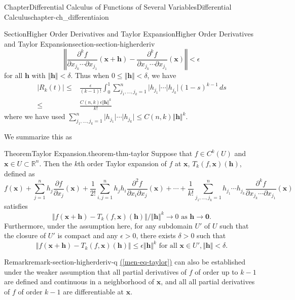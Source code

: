 \documentclass[oneside,10pt,]{book}
\newcommand{\xreffont}{\relax}
\numberwithin{equation}{section}
\newcommand{\bh}{\mathbf{h}}
\newcommand{\bx}{\mathbf{x}}
\newcommand{\bbR}{\mathbb{R}}
\newcommand{\lt}{<}
\newcommand{\amp}{&}
\begin{document}
\begin{chapterptx}{Chapter}{Differential Calculus of Functions of Several Variables}{}{Differential Calculus}{}{}{chapter-ch_differentiaion}
\begin{sectionptx}{Section}{Higher Order Derivatives and Taylor Expansion}{}{Higher Order Derivatives and Taylor Expansion}{}{}{section-section-higherderiv}
\begin{equation*}
\left\Vert \frac{\partial^{k} f}{\partial x_{j_{k}}\cdots \partial x_{j_{1}}}(\bx +\bh) -
\frac{\partial^{k} f}{\partial x_{j_{k}}\cdots \partial x_{j_{1}}}(\bx)\right\Vert \lt \epsilon
\end{equation*}
for all \(\bh\) with \(\Vert \bh \Vert \lt \delta\).  Thus when \(0\le  \Vert \bh \Vert \lt \delta\), we have%
\begin{align*}
\vert R_{k}(t)\vert \le \amp \frac{\epsilon}{(k-1)!} \int_{0}^{1} 
\sum_{j_{1},\ldots,j_{k}=1}^{n} \vert h_{j_{1}}\vert \cdots \vert h_{j_{k}}\vert (1-s)^{k-1}\, ds \\
\le \amp \frac{C(n, k) \epsilon \Vert \bh\Vert^{k} }{k!} 
\end{align*}
where  we have used \(\sum_{j_{1},\ldots,j_{k}=1}^{n} \vert h_{j_{1}}\vert 
\cdots \vert h_{j_{k}}\vert \le C(n, k) \Vert \bh\Vert^{k}\).%
\par
We summarize this as%
\begin{theorem}{Theorem}{Taylor Expansion.}{}{theorem-thm-taylor}%
Suppose that \(f\in C^{k}(U)\) and \(\bx \in U \subset \bbR^{n}\). Then the \(k\)th order Taylor expansion of \(f\) at \(\bx\), \(T_{k}(f,\bx)(\bh) \), defined as%
\begin{equation*}
f(\bx)+	\sum_{j=1}^{n} h_{j}\frac{\partial f}{\partial x_{j}}(\bx)+
\frac{1}{2!} \sum_{i, j=1}^{n} h_{j}h_{i}\frac{\partial^{2} f}{\partial x_{i}\partial x_{j}}(\bx)
+\cdots +  \frac{1}{k!}\sum_{j_{1},\ldots,j_{k}=1}^{n} h_{j_{1}}\cdots h_{j_{k}}\frac{\partial^{k} f}{\partial x_{j_{k}}\cdots \partial x_{j_{1}}}(\bx)
\end{equation*}
satisfies%
\begin{equation}
\Vert f(\bx +\bh)- T_{k}(f,\bx)(\bh) \Vert/\Vert \bh \Vert^{k} \to 0 \text{ as $\bh \to \mathbf 0$}.\label{men-eq-taylor}
\end{equation}
Furthermore, under the assumption here, for any subdomain \(U'\) of \(U\) such that the closure of \(U'\) is compact and any \(\epsilon >0\), there exists \(\delta >0\) such that%
\begin{equation*}
\Vert f(\bx +\bh)- T_{k}(f,\bx)(\bh) \Vert \le \epsilon \Vert \bh \Vert^{k} \text{ for all $\bx\in U',
\Vert \bh \Vert \lt \delta$.}
\end{equation*}
\end{theorem}
\begin{remark}{Remark}{}{remark-section-higherderiv-q}%
\hyperref[men-eq-taylor]{({\xreffont\ref{men-eq-taylor}})} can also be established under the weaker assumption that all partial derivatives of \(f\) of order up to \(k-1\) are defined and continuous in a neighborhood of \(\bx\), and all all partial derivatives of \(f\) of order  \(k-1\) are differentiable at \(\bx\).%

\end{remark}
\end{sectionptx}
\end{chapterptx}
\end{document}
